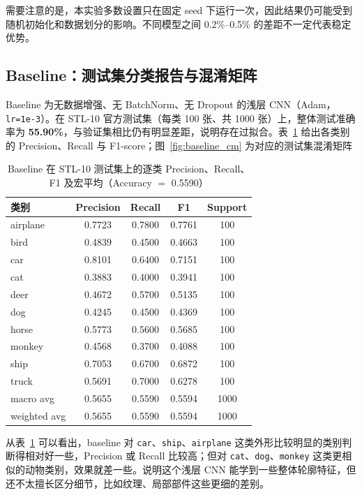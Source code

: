 \documentclass[UTF8]{ctexart}
\begin{document}
需要注意的是，本实验多数设置只在固定 seed 下运行一次，因此结果仍可能受到随机初始化和数据划分的影响。不同模型之间 0.2\%--0.5\% 的差距不一定代表稳定优势。

\subsection{Baseline：测试集分类报告与混淆矩阵}
Baseline 为无数据增强、无 BatchNorm、无 Dropout 的浅层 CNN（Adam，\texttt{lr=1e-3}）。在 STL-10 官方测试集（每类 100 张、共 1000 张）上，整体测试准确率为 \textbf{55.90\%}，与验证集相比仍有明显差距，说明存在过拟合。表~\ref{tab:baseline_report} 给出各类别的 Precision、Recall 与 F1-score；图~\ref{fig:baseline_cm} 为对应的测试集混淆矩阵

\begin{table}[H]
\centering
\footnotesize
\setlength{\tabcolsep}{4pt}
\begin{tabular}{@{}lcccc@{}}
\toprule
类别 & Precision & Recall & F1 & Support \\
\midrule
airplane & 0.7723 & 0.7800 & 0.7761 & 100 \\
bird     & 0.4839 & 0.4500 & 0.4663 & 100 \\
car      & 0.8101 & 0.6400 & 0.7151 & 100 \\
cat      & 0.3883 & 0.4000 & 0.3941 & 100 \\
deer     & 0.4672 & 0.5700 & 0.5135 & 100 \\
dog      & 0.4245 & 0.4500 & 0.4369 & 100 \\
horse    & 0.5773 & 0.5600 & 0.5685 & 100 \\
monkey   & 0.4568 & 0.3700 & 0.4088 & 100 \\
ship     & 0.7053 & 0.6700 & 0.6872 & 100 \\
truck    & 0.5691 & 0.7000 & 0.6278 & 100 \\
\midrule
macro avg    & 0.5655 & 0.5590 & 0.5594 & 1000 \\
weighted avg & 0.5655 & 0.5590 & 0.5594 & 1000 \\
\bottomrule
\end{tabular}
\caption{Baseline 在 STL-10 测试集上的逐类 Precision、Recall、F1 及宏平均（Accuracy $=$ 0.5590）}
\label{tab:baseline_report}
\end{table}

从表~\ref{tab:baseline_report} 可以看出，baseline 对 \texttt{car}、\texttt{ship}、\texttt{airplane} 这类外形比较明显的类别判断得相对好一些，Precision 或 Recall 比较高；但对 \texttt{cat}、\texttt{dog}、\texttt{monkey} 这类更相似的动物类别，效果就差一些。说明这个浅层 CNN 能学到一些整体轮廓特征，但还不太擅长区分细节，比如纹理、局部部件这些更细的差别。
\end{document}

